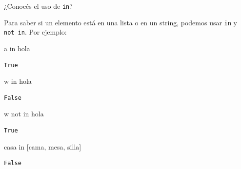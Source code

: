 \documentclass[
  letterpaper,
  DIV=11,
  numbers=noendperiod]{scrreprt}
\newenvironment{Shaded}{\begin{snugshade}}{\end{snugshade}}
\newcommand{\CommentTok}[1]{\textcolor[rgb]{0.37,0.37,0.37}{#1}}
\newcommand{\KeywordTok}[1]{\textcolor[rgb]{0.00,0.23,0.31}{#1}}
\newcommand{\NormalTok}[1]{\textcolor[rgb]{0.00,0.23,0.31}{#1}}
\newcommand{\StringTok}[1]{\textcolor[rgb]{0.13,0.47,0.30}{#1}}
\begin{document}
\begin{tcolorbox}[enhanced jigsaw, colframe=quarto-callout-tip-color-frame, opacityback=0, opacitybacktitle=0.6, bottomrule=.15mm, toprule=.15mm, coltitle=black, breakable, colback=white, leftrule=.75mm, titlerule=0mm, bottomtitle=1mm, toptitle=1mm, rightrule=.15mm, title=\textcolor{quarto-callout-tip-color}{\faLightbulb}\hspace{0.5em}{Tip: \texttt{in} y \texttt{not\ in}}, arc=.35mm, left=2mm, colbacktitle=quarto-callout-tip-color!10!white]

¿Conocés el uso de \texttt{in}?

Para saber si un elemento está en una lista o en un string, podemos usar
\texttt{in} y \texttt{not\ in}. Por ejemplo:

\begin{Shaded}
\begin{Highlighting}[]
\CommentTok{\textquotesingle{}a\textquotesingle{}} \KeywordTok{in} \StringTok{\textquotesingle{}hola\textquotesingle{}}
\end{Highlighting}
\end{Shaded}

\begin{verbatim}
True
\end{verbatim}

\begin{Shaded}
\begin{Highlighting}[]
\CommentTok{\textquotesingle{}w\textquotesingle{}} \KeywordTok{in} \StringTok{\textquotesingle{}hola\textquotesingle{}}
\end{Highlighting}
\end{Shaded}

\begin{verbatim}
False
\end{verbatim}

\begin{Shaded}
\begin{Highlighting}[]
\CommentTok{\textquotesingle{}w\textquotesingle{}} \KeywordTok{not} \KeywordTok{in} \StringTok{\textquotesingle{}hola\textquotesingle{}}
\end{Highlighting}
\end{Shaded}

\begin{verbatim}
True
\end{verbatim}

\begin{Shaded}
\begin{Highlighting}[]
\CommentTok{\textquotesingle{}casa\textquotesingle{}} \KeywordTok{in}\NormalTok{ [}\StringTok{\textquotesingle{}cama\textquotesingle{}}\NormalTok{, }\StringTok{\textquotesingle{}mesa\textquotesingle{}}\NormalTok{, }\StringTok{\textquotesingle{}silla\textquotesingle{}}\NormalTok{]}
\end{Highlighting}
\end{Shaded}

\begin{verbatim}
False
\end{verbatim}

\end{tcolorbox}
\end{document}
